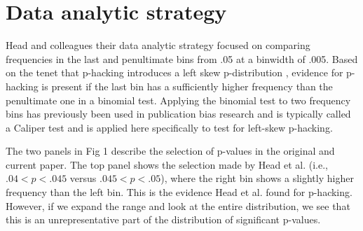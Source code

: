 \section*{Data analytic strategy}
Head and colleagues their data analytic strategy focused on comparing frequencies in the last and penultimate bins from .05 at a binwidth of .005. Based on the tenet that p-hacking introduces a left skew p-distribution \cite{Simonsohn2014}, evidence for p-hacking is present if the last bin has a sufficiently higher frequency than the penultimate one in a binomial test. Applying the binomial test to two frequency bins has previously been used in publication bias research and is typically called a Caliper test \cite{gerber2010, kuhberger2014} and is applied here specifically to test for left-skew p-hacking.

The two panels in Fig 1 describe the selection of p-values in the original and current paper. The top panel shows the selection made by Head et al. (i.e., $.04<p< .045$ versus $.045<p<.05$), where the right bin shows a slightly higher frequency than the left bin. This is the evidence Head et al. found for p-hacking. However, if we expand the range and look at the entire distribution, we see that this is an unrepresentative part of the distribution of significant p-values.
  